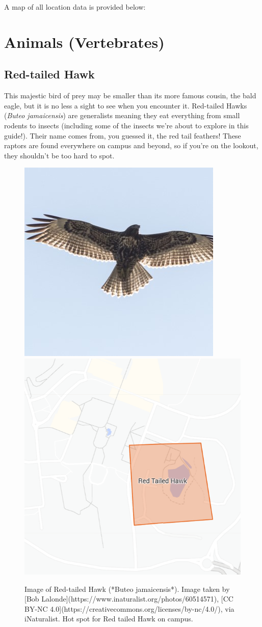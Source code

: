 \documentclass[
]{book}
\begin{document}
A map of all location data is provided below:

\hypertarget{animals-vertebrates}{%
\chapter{Animals (Vertebrates)}\label{animals-vertebrates}}

\hypertarget{red-tailed-hawk}{%
\section{Red-tailed Hawk}\label{red-tailed-hawk}}

This majestic bird of prey may be smaller than its more famous cousin, the bald eagle, but it is no less a sight to see when you encounter it. Red-tailed Hawks (\emph{Buteo jamaicensis}) are generalists meaning they eat everything from small rodents to insects (including some of the insects we're about to explore in this guide!). Their name comes from, you guessed it, the red tail feathers! These raptors are found everywhere on campus and beyond, so if you're on the lookout, they shouldn't be too hard to spot.

\begin{figure}

{\centering \includegraphics[width=0.49\linewidth,height=0.2\textheight]{animal_images/hawk_11} \includegraphics[width=0.49\linewidth,height=0.2\textheight]{animal_images/hawk_hotspot_11} 

}

\caption{Image of Red-tailed Hawk (*Buteo jamaicensis*). Image taken by [Bob Lalonde](https://www.inaturalist.org/photos/60514571), [CC BY-NC 4.0](https://creativecommons.org/licenses/by-nc/4.0/), via iNaturalist. Hot spot for Red tailed Hawk on campus.}\label{fig:unnamed-chunk-1}
\end{figure}
\end{document}
